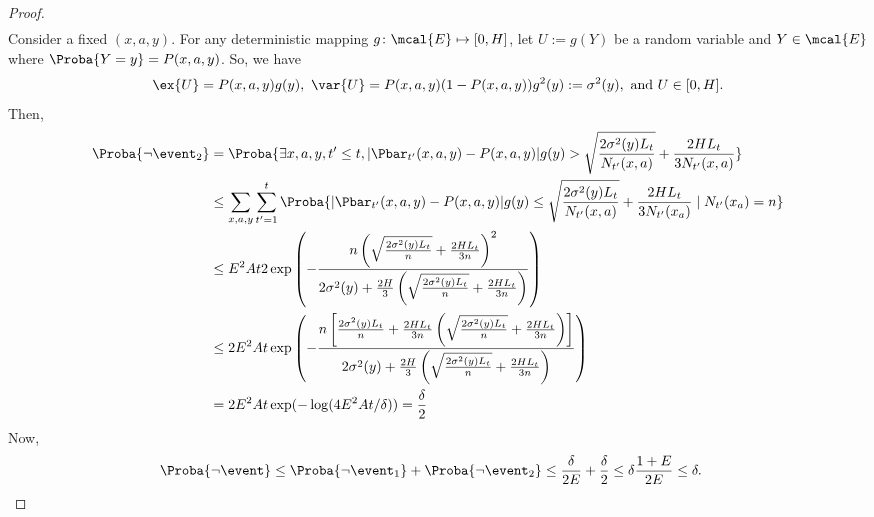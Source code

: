 \begin{proof}
\begin{align*}
        \end{align*}
        Consider a fixed $(x,a,y)$. For any deterministic mapping $g\colon\mcal{E}\mapsto[0,H]$, let $U:=g(Y)$ be a random variable and $Y\in\mcal{E}$ where $\Proba{Y=y}=P(x,a,y)$.
        So, we have
        \begin{align*}
        \ex{U}=P(x,a,y)g(y),\ \var{U}=P(x,a,y)(1-P(x,a,y))g^2(y):=\sigma^2(y), \text{ and } U\in[0,H].
        \end{align*}
        Then,
        \begin{align*}
        \Proba{\neg\event_2}
        &=\Proba{\exists x,a,y,t'\le t,|\Pbar_{t'}(x,a,y)-P(x,a,y)|g(y) >\sqrt{\frac{2\sigma^2(y)L_t}{N_{t'}(x,a)}} +\frac{2HL_t}{3N_{t'}(x,a)}} \\
        &\le\sum_{x,a,y} \sum_{t'=1}^{t} \Proba{|\Pbar_{t'}(x,a,y)-P(x,a,y)|g(y) \le\sqrt{\frac{2\sigma^2(y)L_t}{N_{t'}(x,a)}} +\frac{2HL_t}{3N_{t'}(x_a)}\mid N_{t'}(x_a)=n} \\
        &\le E^2At 2\exp\left(-\frac{n\left(\sqrt{\frac{2\sigma^2(y)L_t}{n}} +\frac{2HL_t}{3n}\right)^2}{2\sigma^2(y)+\frac{2H}{3}\left(\sqrt{\frac{2\sigma^2(y)L_t}{n}} +\frac{2HL_t}{3n}\right)}\right) \\
        &\le 2E^2At\exp\left(-\frac{n\left[\frac{2\sigma^2(y)L_t}{n} +\frac{2HL_t}{3n}\left(\sqrt{\frac{2\sigma^2(y)L_t}{n}} +\frac{2HL_t}{3n}\right)\right]}{2\sigma^2(y)+\frac{2H}{3}\left(\sqrt{\frac{2\sigma^2(y)L_t}{n}} +\frac{2HL_t}{3n}\right)}\right) \\
        &=2E^2At\exp(-\log(4E^2At/\delta)) = \frac{\delta}2
        \end{align*}
        Now,
        \begin{align*}
        \Proba{\neg\event} 
        &\le\Proba{\neg\event_1} +\Proba{\neg\event_2}\le\frac{\delta}{2E} +\frac{\delta}2\le \delta\frac{1+E}{2E} \le \delta.
        \end{align*}
        \end{proof}
        
